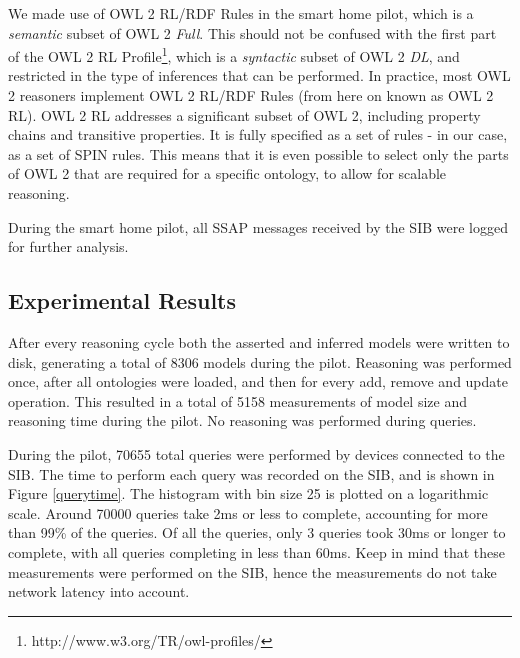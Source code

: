 
We made use of OWL 2 RL/RDF Rules in the smart home pilot, which is a \emph{semantic} subset of OWL 2 \emph{Full}. This should not be confused with the first part of the OWL 2 RL Profile\footnote{http://www.w3.org/TR/owl-profiles/}, which is a \emph{syntactic} subset of OWL 2 \emph{DL}, and restricted in the type of inferences that can be performed. In practice, most OWL 2 reasoners implement OWL 2 RL/RDF Rules (from here on known as OWL 2 RL). OWL 2 RL addresses a significant subset of OWL 2, including property chains and transitive properties. It is fully specified as a set of rules - in our case, as a set of \ac{SPIN} rules. This means that it is even possible to select only the parts of OWL 2 that are required for a specific ontology, to allow for scalable reasoning.

During the smart home pilot, all \ac{SSAP} messages received by the \ac{SIB} were logged for further analysis.

\subsection{Experimental Results}
\label{results}

After every reasoning cycle both the asserted and inferred models were written to disk, generating a total of 8306 models during the pilot. Reasoning was performed once, after all ontologies were loaded, and then for every add, remove and update operation. This resulted in a total of 5158 measurements of model size and reasoning time during the pilot. No reasoning was performed during queries.

During the pilot, 70655 total queries were performed by devices connected to the \ac{SIB}. The time to perform each query was recorded on the \ac{SIB}, and is shown in Figure \ref{querytime}. The histogram with bin size 25 is plotted on a logarithmic scale. Around 70000 queries take 2ms or less to complete, accounting for more than 99\% of the queries. Of all the queries, only 3 queries took 30ms or longer to complete, with all queries completing in less than 60ms. Keep in mind that these measurements were performed on the \ac{SIB}, hence the measurements do not take network latency into account.

